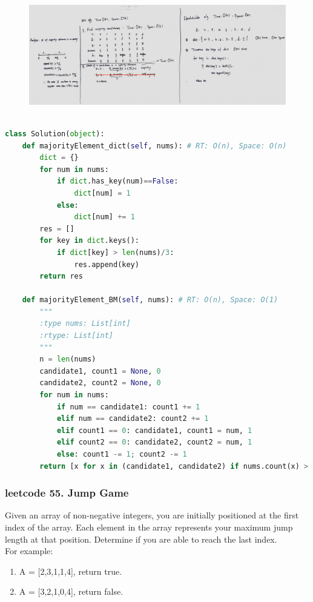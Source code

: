\documentclass[a4paper,10pt]{article}
\begin{document}
\begin{figure}[h]
    \includegraphics[width=\textwidth]{leetcode229.jpg}
    \centering \\
\end{figure}

\begin{lstlisting}[language=Python, caption=Problem229. Majority Element II]

class Solution(object):
    def majorityElement_dict(self, nums): # RT: O(n), Space: O(n)
        dict = {}
        for num in nums:
            if dict.has_key(num)==False:
                dict[num] = 1
            else:
                dict[num] += 1
        res = []
        for key in dict.keys():
            if dict[key] > len(nums)/3:
                res.append(key)
        return res
        
    def majorityElement_BM(self, nums): # RT: O(n), Space: O(1)
        """
        :type nums: List[int]
        :rtype: List[int]
        """
        n = len(nums)
        candidate1, count1 = None, 0
        candidate2, count2 = None, 0
        for num in nums:
            if num == candidate1: count1 += 1
            elif num == candidate2: count2 += 1
            elif count1 == 0: candidate1, count1 = num, 1
            elif count2 == 0: candidate2, count2 = num, 1
            else: count1 -= 1; count2 -= 1
        return [x for x in (candidate1, candidate2) if nums.count(x) > n/3]
\end{lstlisting}


\subsubsection{leetcode 55. Jump Game}
Given an array of non-negative integers, you are initially positioned at the first index of the array. Each element in the array represents your maximum jump length at that position. Determine if you are able to reach the last index. \\

\noindent For example:
\begin{enumerate}
    \item A = [2,3,1,1,4], return true.
    \item A = [3,2,1,0,4], return false.
\end{enumerate}
\end{document}
